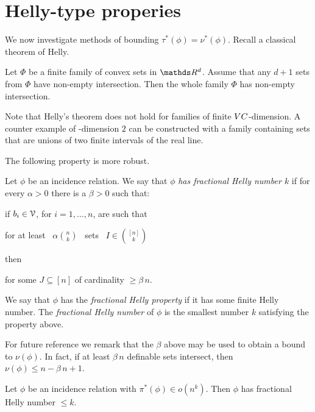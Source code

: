 \documentclass[sputnik.tex]{subfiles}
\begin{document}
\section{Helly-type properies}

We now investigate methods of bounding $\tau^*(\phi)=\nu^*(\phi)$.
Recall a classical theorem of Helly.

\begin{proposition}
Let $\Phi$ be a finite family of convex sets in $\RR^d$.
Assume that any $d+1$ sets from $\Phi$ have non-empty intersection.
Then the whole family $\Phi$ has non-empty intersection.
\end{proposition}

Note that Helly's theorem does not hold for families of finite ${\footnotesize VC}$-dimension.
A counter example of \vc-dimension $2$ can be constructed with a family containing sets that are unions of two finite intervals of the real line.

The following property is more robust.

\begin{definition}
Let $\phi$ be an incidence relation.
We say that $\phi$ \emph{has fractional Helly number $k$\/} if for every $\alpha>0$ there is a $\beta>0$ such that:

if $b_i\in\EuScript V$, for $i=1,\dots,n$, are such that

\hfill for at least \ $\displaystyle\alpha{n\choose k}$ \ sets \ $\displaystyle I\in{[n]\choose k}$

then

\hfill for some $J\subseteq [n]$ of cardinality $\ge\beta\,n$.

We say that $\phi$ has the \emph{fractional Helly property\/} if it has some finite Helly number.
The \emph{fractional Helly number\/} of $\phi$ is the smallest number $k$ satisfying the property above.
\QED
\end{definition}

For future reference we remark that the $\beta$ above may be used to obtain a bound to $\nu(\phi)$. In fact, if at least $\beta\,n$ definable sets intersect, then $\nu(\phi)\le n-\beta\,n+1$.  

\begin{theorem}
Let $\phi$ be an incidence relation with $\pi^*(\phi)\in o(n^k)$.
Then $\phi$ has fractional Helly number $\le k$.
\end{theorem}
\end{document}

